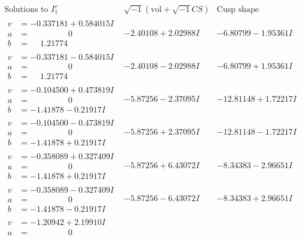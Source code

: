 \documentclass[1p]{elsarticle_modified}
\theoremstyle{definition}
\newcommand{\I}{\sqrt{-1}}
\begin{document}
$$\begin{array}{c|c|c}  
\text{Solutions to }I^v_{1}& \I (\text{vol} + \sqrt{-1}CS) & \text{Cusp shape}\\
 \hline 
\begin{aligned}
v &= -0.337181 + 0.584015 I \\
a &= \phantom{-0.000000 } 0 \\
b &= \phantom{-}1.21774\phantom{ +0.000000I}\end{aligned}
 & -2.40108 + 2.02988 I & -6.80799 - 1.95361 I \\ \hline\begin{aligned}
v &= -0.337181 - 0.584015 I \\
a &= \phantom{-0.000000 } 0 \\
b &= \phantom{-}1.21774\phantom{ +0.000000I}\end{aligned}
 & -2.40108 - 2.02988 I & -6.80799 + 1.95361 I \\ \hline\begin{aligned}
v &= -0.104500 + 0.473819 I \\
a &= \phantom{-0.000000 } 0 \\
b &= -1.41878 - 0.21917 I\end{aligned}
 & -5.87256 - 2.37095 I & -12.81148 + 1.72217 I \\ \hline\begin{aligned}
v &= -0.104500 - 0.473819 I \\
a &= \phantom{-0.000000 } 0 \\
b &= -1.41878 + 0.21917 I\end{aligned}
 & -5.87256 + 2.37095 I & -12.81148 - 1.72217 I \\ \hline\begin{aligned}
v &= -0.358089 + 0.327409 I \\
a &= \phantom{-0.000000 } 0 \\
b &= -1.41878 + 0.21917 I\end{aligned}
 & -5.87256 + 6.43072 I & -8.34383 - 2.96651 I \\ \hline\begin{aligned}
v &= -0.358089 - 0.327409 I \\
a &= \phantom{-0.000000 } 0 \\
b &= -1.41878 - 0.21917 I\end{aligned}
 & -5.87256 - 6.43072 I & -8.34383 + 2.96651 I \\ \hline\begin{aligned}
v &= -1.20942 + 2.19910 I \\
a &= \phantom{-0.000000 } 0 \\

\end{aligned}
\end{array}$$
\end{document}
